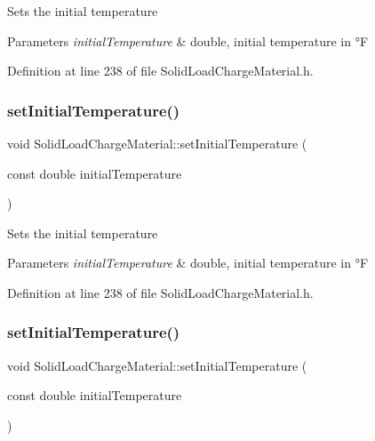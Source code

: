 Sets the initial temperature 
\begin{DoxyParams}{Parameters}
{\em initial\+Temperature} & double, initial temperature in °F \\
\hline
\end{DoxyParams}


Definition at line 238 of file Solid\+Load\+Charge\+Material.\+h.

\mbox{\label{class_solid_load_charge_material_ac80e565d26e68e542f4cb41f41b7d96c}} 
\subsubsection{\texorpdfstring{set\+Initial\+Temperature()}{setInitialTemperature()}\hspace{0.1cm}{\footnotesize\ttfamily [2/3]}}
{\footnotesize\ttfamily void Solid\+Load\+Charge\+Material\+::set\+Initial\+Temperature (\begin{DoxyParamCaption}\item[{const double}]{initial\+Temperature }\end{DoxyParamCaption})\hspace{0.3cm}{\ttfamily [inline]}}

Sets the initial temperature 
\begin{DoxyParams}{Parameters}
{\em initial\+Temperature} & double, initial temperature in °F \\
\hline
\end{DoxyParams}


Definition at line 238 of file Solid\+Load\+Charge\+Material.\+h.

\mbox{\label{class_solid_load_charge_material_ac80e565d26e68e542f4cb41f41b7d96c}} 
\subsubsection{\texorpdfstring{set\+Initial\+Temperature()}{setInitialTemperature()}\hspace{0.1cm}{\footnotesize\ttfamily [3/3]}}
{\footnotesize\ttfamily void Solid\+Load\+Charge\+Material\+::set\+Initial\+Temperature (\begin{DoxyParamCaption}\item[{const double}]{initial\+Temperature }\end{DoxyParamCaption})\hspace{0.3cm}{\ttfamily [inline]}}

